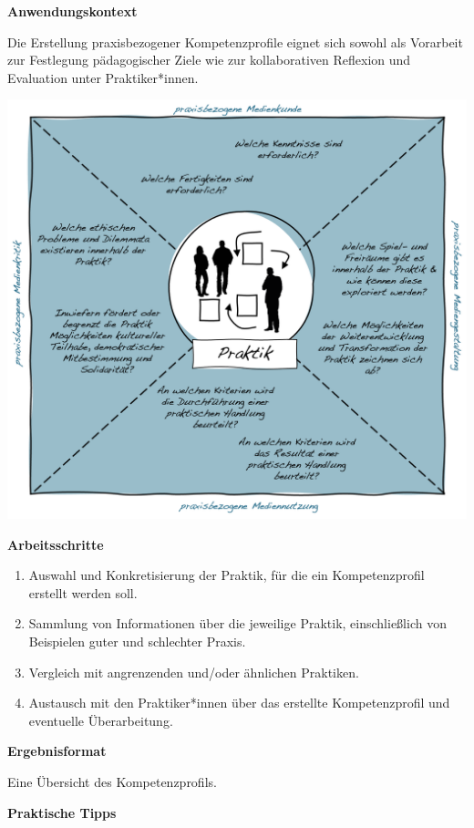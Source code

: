 \documentclass[
  a4paper,
]{book}
\providecommand{\tightlist}{%
  \setlength{\itemsep}{0pt}\setlength{\parskip}{0pt}}
\begin{document}
\textbf{Anwendungskontext}

Die Erstellung praxisbezogener Kompetenzprofile eignet sich sowohl als Vorarbeit zur Festlegung pädagogischer Ziele wie zur kollaborativen Reflexion und Evaluation unter Praktiker*innen.

\begin{center}\includegraphics{Figures/13-03} \end{center}

\textbf{Arbeitsschritte}

\begin{enumerate}
\def\labelenumi{\arabic{enumi}.}
\tightlist
\item
  Auswahl und Konkretisierung der Praktik, für die ein Kompetenzprofil erstellt werden soll.
\item
  Sammlung von Informationen über die jeweilige Praktik, einschließlich von Beispielen guter und schlechter Praxis.
\item
  Vergleich mit angrenzenden und/oder ähnlichen Praktiken.
\item
  Austausch mit den Praktiker*innen über das erstellte Kompetenzprofil und eventuelle Überarbeitung.
\end{enumerate}

\textbf{Ergebnisformat}

Eine Übersicht des Kompetenzprofils.

\textbf{Praktische Tipps}
\end{document}

